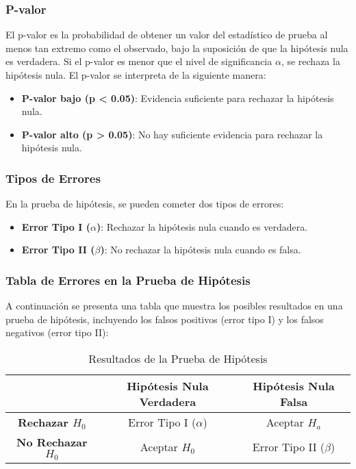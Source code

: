 \subsubsection{P-valor}

El p-valor es la probabilidad de obtener un valor del estad\'istico de prueba al menos tan extremo como el observado, bajo la suposici\'on de que la hip\'otesis nula es verdadera. Si el p-valor es menor que el nivel de significancia $\alpha$, se rechaza la hip\'otesis nula. El p-valor se interpreta de la siguiente manera:

\begin{itemize}
    \item \textbf{P-valor bajo (p < 0.05)}: Evidencia suficiente para rechazar la hip\'otesis nula.
    \item \textbf{P-valor alto (p > 0.05)}: No hay suficiente evidencia para rechazar la hip\'otesis nula.
\end{itemize}

\subsubsection{Tipos de Errores}

En la prueba de hip\'otesis, se pueden cometer dos tipos de errores:

\begin{itemize}
    \item \textbf{Error Tipo I ($\alpha$)}: Rechazar la hip\'otesis nula cuando es verdadera.
    \item \textbf{Error Tipo II ($\beta$)}: No rechazar la hip\'otesis nula cuando es falsa.
\end{itemize}

\subsubsection{Tabla de Errores en la Prueba de Hip\'otesis}

A continuaci\'on se presenta una tabla que muestra los posibles resultados en una prueba de hip\'otesis, incluyendo los falsos positivos (error tipo I) y los falsos negativos (error tipo II):

\begin{table}[h]
\centering
\begin{tabular}{|c|c|c|}
\hline
 & \textbf{Hip\'otesis Nula Verdadera} & \textbf{Hip\'otesis Nula Falsa} \\
\hline
\textbf{Rechazar $H_0$} & Error Tipo I ($\alpha$) & Aceptar $H_a$ \\
\hline
\textbf{No Rechazar $H_0$} & Aceptar $H_0$ & Error Tipo II ($\beta$) \\
\hline
\end{tabular}
\caption{Resultados de la Prueba de Hip\'otesis}
\label{tab:hypothesis_testing}
\end{table}

